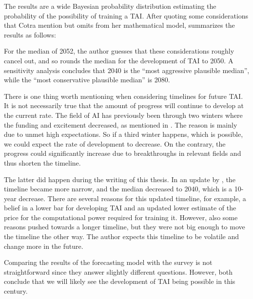 \documentclass[12pt,A4]{report}
\theoremstyle{definition}
\begin{document}
The results are a wide Bayesian probability distribution estimating the probability of the possibility of training a TAI. After quoting some considerations that Cotra mention but omits from her mathematical model, \citet{an121} summarizes the results as follows:
\begin{displayquote}
For the median of 2052, the author guesses that these considerations roughly cancel out, and so rounds the median for the development of TAI to 2050. A sensitivity analysis concludes that 2040 is the “most aggressive plausible median”, while the “most conservative plausible median” is 2080.
\end{displayquote}

There is one thing worth mentioning when considering timelines for future TAI. It is not necessarily true that the amount of progress will continue to develop at the current rate. The field of AI has previously been through two winters where the funding and excitement decreased, as mentioned in \citet[p.42]{RussellNorvig}. The reason is mainly due to unmet high expectations. So if a third winter happens, which is possible, we could expect the rate of development to decrease. On the contrary, the progress could significantly increase due to breakthroughs in relevant fields and thus shorten the timeline. 

The latter did happen during the writing of this thesis. In an update by \citet{Cotra22}, the timeline became more narrow, and the median decreased to 2040, which is a 10-year decrease. There are several reasons for this updated timeline, for example, a belief in a lower bar for developing TAI and an updated lower estimate of the price for the computational power required for training it. However, also some reasons pushed towards a longer timeline, but they were not big enough to move the timeline the other way. The author expects this timeline to be volatile and change more in the future. 

Comparing the results of the forecasting model with the survey is not straightforward since they answer slightly different questions. However, both conclude that we will likely see the development of TAI being possible in this century.
\end{document}
